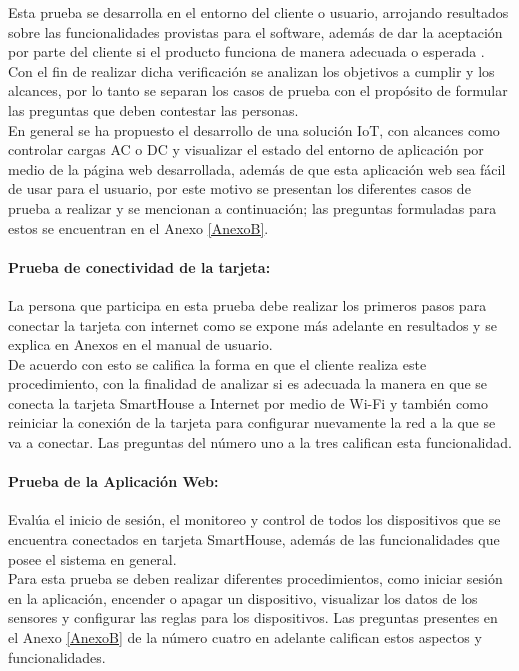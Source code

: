
Esta prueba se desarrolla en el entorno del cliente o usuario, arrojando resultados sobre las funcionalidades provistas para el software, además de dar la aceptación por parte del cliente si el producto funciona de manera adecuada o esperada \cite{PB}. Con el fin de realizar dicha verificación se analizan los objetivos a cumplir y los alcances, por lo tanto se separan los casos de prueba con el propósito de formular las preguntas que deben contestar las personas.\\

En general se ha propuesto el desarrollo de una solución IoT, con alcances como controlar cargas AC o DC y visualizar el estado del entorno de aplicación por medio de la página web desarrollada, además de que esta aplicación web sea fácil de usar para el usuario, por este motivo se presentan los diferentes casos de prueba a realizar y se mencionan a continuación; las preguntas formuladas para estos se encuentran en el Anexo \ref{AnexoB}.

\paragraph{Prueba de conectividad de la tarjeta:} La persona que participa en esta prueba debe realizar los primeros pasos para conectar la tarjeta con internet como se expone más adelante en resultados y se explica en Anexos en el manual de usuario.\\

De acuerdo con esto se califica la forma en que el cliente realiza este procedimiento, con la finalidad de analizar si es adecuada la manera en que se conecta la tarjeta SmartHouse a Internet por medio de Wi-Fi y también como reiniciar la conexión de la tarjeta para configurar nuevamente la red a la que se va a conectar. Las preguntas del número uno a la tres califican esta funcionalidad.\\

\paragraph{Prueba de la Aplicación Web:} Evalúa el inicio de sesión, el monitoreo y control de todos los dispositivos que se encuentra conectados en tarjeta SmartHouse, además de las funcionalidades que posee el sistema en general.\\

Para esta prueba se deben realizar diferentes procedimientos, como iniciar sesión en la aplicación, encender o apagar un dispositivo, visualizar los datos de los sensores y configurar las reglas para los dispositivos. Las preguntas presentes en el Anexo \ref{AnexoB} de la número cuatro en adelante califican estos aspectos y funcionalidades.\\

